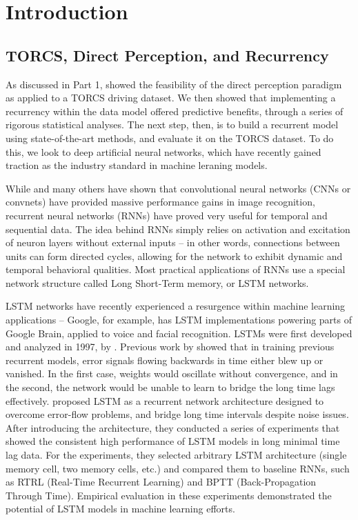 \documentclass[master]{subfiles}
\begin{document}
\section{Introduction}
\subsection{TORCS, Direct Perception, and Recurrency}
As discussed in Part 1, \cite{deepdriving} showed the feasibility of the direct perception paradigm as applied to a TORCS driving dataset.  We then showed that implementing a recurrency within the data model offered predictive benefits, through a series of rigorous statistical analyses.  The next step, then, is to build a recurrent model using state-of-the-art methods, and evaluate it on the TORCS dataset.  To do this, we look to deep artificial neural networks, which have recently gained traction as the industry standard in machine leraning models.\par
While \cite{lenet} and many others have shown that convolutional neural networks (CNNs or convnets) have provided massive performance gains in image recognition, recurrent neural networks (RNNs) have proved very useful for temporal and sequential data.  The idea behind RNNs simply relies on activation and excitation of neuron layers without external inputs -- in other words, connections between units can form directed cycles, allowing for the network to exhibit dynamic and temporal behavioral qualities.  Most practical applications of RNNs use a special network structure called Long Short-Term memory, or LSTM networks.\par
LSTM networks have recently experienced a resurgence within machine learning applications -- Google, for example, has LSTM implementations powering parts of Google Brain, applied to voice and facial recognition.  LSTMs were first developed and analyzed in 1997, by \cite{lstm_hochreiter}.  Previous work by \cite{hochreiter_analysis} showed that in training previous recurrent models, error signals flowing backwards in time either blew up or vanished.  In the first case, weights would oscillate without convergence, and in the second, the network would be unable to learn to bridge the long time lags effectively.  \cite{lstm_hochreiter} proposed LSTM as a recurrent network architecture designed to overcome error-flow problems, and bridge long time intervals despite noise issues.  After introducing the architecture, they conducted a series of experiments that showed the consistent high performance of LSTM models in long minimal time lag data.  For the experiments, they selected arbitrary LSTM architecture (single memory cell, two memory cells, etc.) and compared them to baseline RNNs, such as RTRL (Real-Time Recurrent Learning) and BPTT (Back-Propagation Through Time).  Empirical evaluation in these experiments demonstrated the potential of LSTM models in machine learning efforts.
\end{document}
